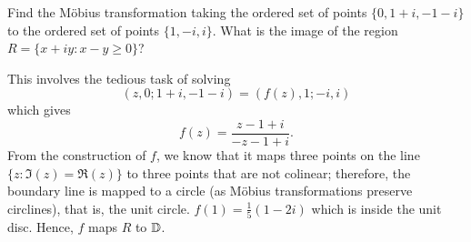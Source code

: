 \setcounter{question}{12}
\question Find the M\"obius transformation taking the ordered set of points $\{0, 1 + i, -1 - i\}$ to the ordered set of points $\{1, -i, i\}$. 
What is the image of the region $R = \{ x + iy: x - y \geq 0 \}$?
\begin{solution}
    This involves the tedious task of solving
    \[ (z, 0; 1+i, -1-i) = (f(z), 1; -i, i) \]
    which gives
    \[ f(z) = \frac{z - 1 + i}{-z - 1 + i}. \]
    From the construction of $f$, we know that it maps three points on the line $\{z : \Im(z) = \Re(z)\}$ to three points that are not colinear; 
    therefore, the boundary line is mapped to a circle (as M\"obius transformations preserve circlines), that is, the unit circle.
    $f(1) = \frac15 (1-2i)$ which is inside the unit disc.
    Hence, $f$ maps $R$ to $\mathbb{D}$.
\end{solution}
